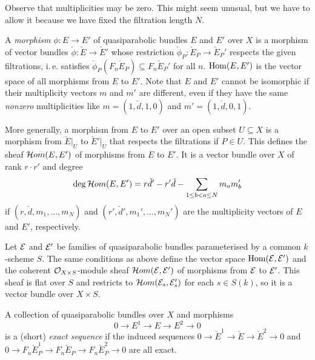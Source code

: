 \documentclass{article}
\begin{document}
Observe that multiplicities may be zero. This might seem unusual, but we have to allow it because we have fixed the filtration length $N$.

A \emph{morphism} $\phi: E \to E'$ of quasiparabolic bundles $E$ and $E'$ over $X$ is a morphism of vector bundles $\check{\phi}:\check{E} \to \check{E}'$
whose restriction $\check{\phi}_P: \check{E}_P \to \check{E}_P'$ respects the given filtrations, i.\,e. satisfies $\check{\phi}_P( F_n \check{E}_P )
\subseteq F_n \check{E}_P'$ for all $n$. $\mathrm{Hom}(E, E')$ is the vector space of all morphisms from $E$ to $E'$. Note that $E$ and $E'$ cannot be isomorphic
if their multiplicity vectors $m$ and $m'$ are different, even if they have the same \emph{nonzero} multiplicities like $m = (1, \check{d}, 1, 0)$ and
$m' = (1, \check{d}, 0, 1)$.

More generally, a morphism from $E$ to $E'$ over an open subset $U \subseteq X$ is a morphism from $\check{E}|_U$ to $\check{E}'|_U$ that respects the
filtrations if $P \in U$. This defines the sheaf $\mathcal{H}om(E, E')$ of morphisms from $E$ to $E'$. It is a vector bundle over $X$ of rank $r \cdot r'$
and degree
\begin{equation} \label{homdeg}
  \deg \mathcal{H}om(E, E') = r \check{d}' - r' \check{d} - \sum_{1 \leq b < a \leq N} m_a m_b'
\end{equation}
if $(r, \check{d}, m_1, \ldots, m_N)$ and $(r', \check{d}', m_1', \ldots, m_N')$ are the multiplicity vectors of $E$ and $E'$, respectively.

Let $\mathcal{E}$ and $\mathcal{E}'$ be families of quasiparabolic bundles parameterised by a common $k$-scheme $S$. The same conditions as above define the vector space
$\mathrm{Hom}( \mathcal{E}, \mathcal{E}')$ and the coherent $\mathcal{O}_{X \times S}$-module sheaf $\mathcal{H}om( \mathcal{E}, \mathcal{E}')$ of morphisms from $\mathcal{E}$ to $\mathcal{E}'$. This sheaf is flat over $S$ and
restricts to $\mathcal{H}om( \mathcal{E}_s, \mathcal{E}_s')$ for each $s \in S(k)$, so it is a vector bundle over $X \times S$.

\begin{defn}
  A collection of quasiparabolic bundles over $X$ and morphisms
  \begin{displaymath}
    0 \to E^1 \to E \to E^2 \to 0
  \end{displaymath}
  is a (short) \emph{exact sequence} if the induced sequences $0 \to \check{E}^1 \to \check{E} \to \check{E}^2 \to 0$ and
  $0 \to F_n \check{E}_P^1 \to F_n \check{E}_P \to F_n \check{E}_P^2 \to 0$ are all exact.
\end{defn}
\end{document}
